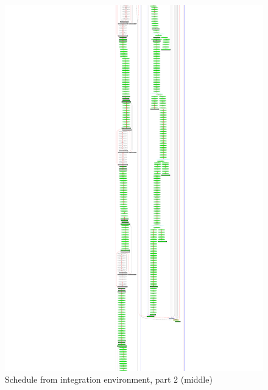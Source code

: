 \documentclass[12pt,a4paper]{report}
\begin{document}
    \begin{figure}
        \centering
        \includegraphics*[width=1.0\textwidth,keepaspectratio]{tsl020-2.pdf}
        \caption{Schedule from integration environment, part 2 (middle)}
        \label{fig:tsl020-2}
    \end{figure}
\end{document}
